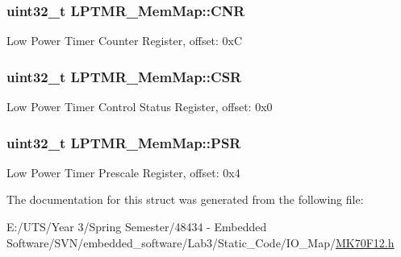 \subsubsection[{C\+N\+R}]{\setlength{\rightskip}{0pt plus 5cm}uint32\+\_\+t L\+P\+T\+M\+R\+\_\+\+Mem\+Map\+::\+C\+N\+R}\label{struct_l_p_t_m_r___mem_map_adda036ea26ea5cc89d7957779c5680f0}
Low Power Timer Counter Register, offset\+: 0x\+C \hypertarget{struct_l_p_t_m_r___mem_map_a4dcb593756f09d67e3d064d95e3f2d68}{}
\subsubsection[{C\+S\+R}]{\setlength{\rightskip}{0pt plus 5cm}uint32\+\_\+t L\+P\+T\+M\+R\+\_\+\+Mem\+Map\+::\+C\+S\+R}\label{struct_l_p_t_m_r___mem_map_a4dcb593756f09d67e3d064d95e3f2d68}
Low Power Timer Control Status Register, offset\+: 0x0 \hypertarget{struct_l_p_t_m_r___mem_map_a05f0c5c90722e5a1757c262c818d2462}{}
\subsubsection[{P\+S\+R}]{\setlength{\rightskip}{0pt plus 5cm}uint32\+\_\+t L\+P\+T\+M\+R\+\_\+\+Mem\+Map\+::\+P\+S\+R}\label{struct_l_p_t_m_r___mem_map_a05f0c5c90722e5a1757c262c818d2462}
Low Power Timer Prescale Register, offset\+: 0x4 

The documentation for this struct was generated from the following file\+:\begin{DoxyCompactItemize}
\item 
E\+:/\+U\+T\+S/\+Year 3/\+Spring Semester/48434 -\/ Embedded Software/\+S\+V\+N/embedded\+\_\+software/\+Lab3/\+Static\+\_\+\+Code/\+I\+O\+\_\+\+Map/\hyperlink{_m_k70_f12_8h}{M\+K70\+F12.\+h}\end{DoxyCompactItemize}
